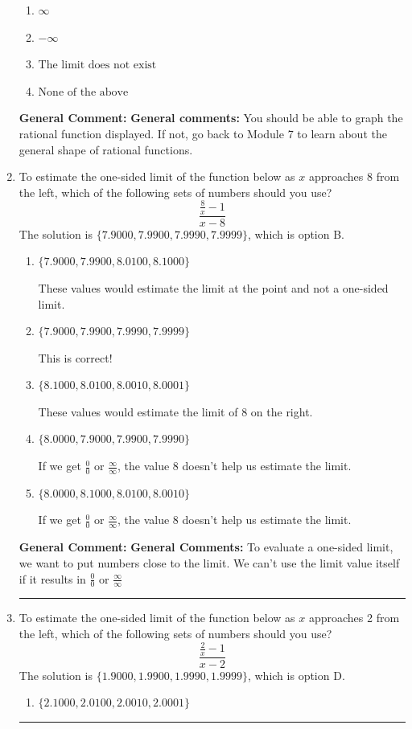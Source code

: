 \documentclass{extbook}[14pt]
\newcommand{\litem}[1]{\item #1

\rule{\textwidth}{0.4pt}}
\begin{document}
\begin{enumerate}
{\begin{enumerate}[label=\Alph*.]
\item \( \infty \)


\item \( -\infty \)


\item \( \text{The limit does not exist} \)


\item \( \text{None of the above} \)


\end{enumerate}

\textbf{General Comment:} \textbf{General comments:} You should be able to graph the rational function displayed. If not, go back to Module 7 to learn about the general shape of rational functions.
}
\litem{
To estimate the one-sided limit of the function below as $x$ approaches 8 from the left, which of the following sets of numbers should you use?
\[ \frac{\frac{8}{x} - 1}{x - 8} \]The solution is \( \{ 7.9000, 7.9900, 7.9990, 7.9999 \} \), which is option B.\begin{enumerate}[label=\Alph*.]
\item \( \{ 7.9000, 7.9900, 8.0100, 8.1000 \} \)

These values would estimate the limit at the point and not a one-sided limit.
\item \( \{ 7.9000, 7.9900, 7.9990, 7.9999 \} \)

This is correct!
\item \( \{ 8.1000, 8.0100, 8.0010, 8.0001 \} \)

These values would estimate the limit of 8 on the right.
\item \( \{ 8.0000, 7.9000, 7.9900, 7.9990 \} \)

If we get $\frac{0}{0}$ or $\frac{\infty}{\infty}$, the value 8 doesn't help us estimate the limit.
\item \( \{ 8.0000, 8.1000, 8.0100, 8.0010 \} \)

If we get $\frac{0}{0}$ or $\frac{\infty}{\infty}$, the value 8 doesn't help us estimate the limit.
\end{enumerate}

\textbf{General Comment:} \textbf{General Comments:} To evaluate a one-sided limit, we want to put numbers close to the limit. We can't use the limit value itself if it results in $\frac{0}{0}$ or $\frac{\infty}{\infty}$
}
\litem{
To estimate the one-sided limit of the function below as $x$ approaches 2 from the left, which of the following sets of numbers should you use?
\[ \frac{\frac{2}{x} - 1}{x - 2} \]The solution is \( \{ 1.9000, 1.9900, 1.9990, 1.9999 \} \), which is option D.\begin{enumerate}[label=\Alph*.]
\item \( \{ 2.1000, 2.0100, 2.0010, 2.0001 \} \)


\end{enumerate}}
\end{enumerate}
\end{document}
